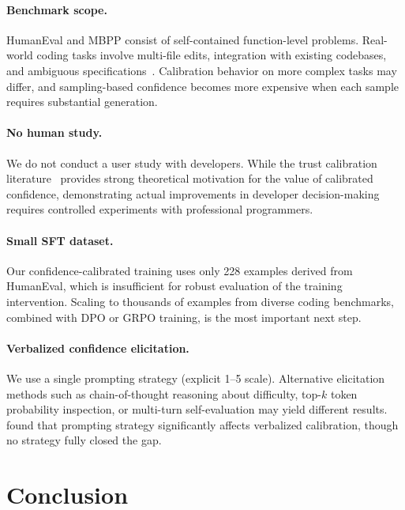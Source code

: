 \documentclass{article}
\begin{document}
\paragraph{Benchmark scope.}
HumanEval and MBPP consist of self-contained function-level problems. Real-world coding tasks involve multi-file edits, integration with existing codebases, and ambiguous specifications~\citep{jimenez2024swe}. Calibration behavior on more complex tasks may differ, and sampling-based confidence becomes more expensive when each sample requires substantial generation.

\paragraph{No human study.}
We do not conduct a user study with developers. While the trust calibration literature~\citep{lee2004trust, yin2019understanding} provides strong theoretical motivation for the value of calibrated confidence, demonstrating actual improvements in developer decision-making requires controlled experiments with professional programmers.

\paragraph{Small SFT dataset.}
Our confidence-calibrated training uses only 228 examples derived from HumanEval, which is insufficient for robust evaluation of the training intervention. Scaling to thousands of examples from diverse coding benchmarks, combined with DPO or GRPO training, is the most important next step.

\paragraph{Verbalized confidence elicitation.}
We use a single prompting strategy (explicit 1--5 scale). Alternative elicitation methods such as chain-of-thought reasoning about difficulty, top-$k$ token probability inspection, or multi-turn self-evaluation may yield different results. \citet{xiong2024can} found that prompting strategy significantly affects verbalized calibration, though no strategy fully closed the gap.

\section{Conclusion}
\label{sec:conclusion}
\end{document}
